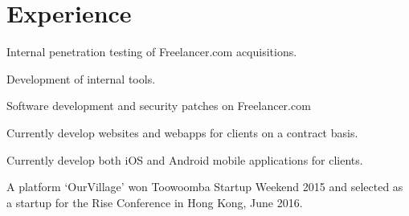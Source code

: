 \documentclass[letterpaper]{deedy-resume} %
\begin{document}
\begin{minipage}[t]{0.60\textwidth} %



\section{Experience}
\vspace{\topsep}


\vspace{\topsep} %
\vspace{\topsep} %
\begin{tightitemize}
\item Internal penetration testing of Freelancer.com acquisitions.
\item Development of internal tools.
\item Software development and security patches on Freelancer.com
\end{tightitemize}

\sectionspace %



\vspace{\topsep} %
\begin{tightitemize}
\item Currently develop websites and webapps for clients on a contract basis.
\item Currently develop both iOS and Android mobile applications for clients.
\item A platform `OurVillage' won Toowoomba Startup Weekend 2015 and selected as a startup for the Rise Conference in Hong Kong, June 2016.
\end{tightitemize}

\sectionspace %

%
%


\end{minipage}
\end{document}
